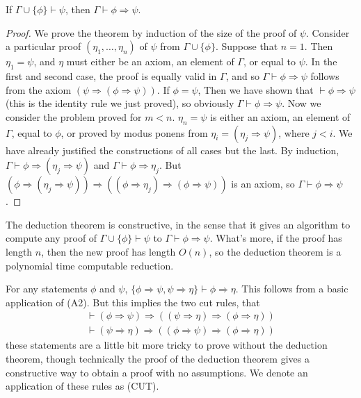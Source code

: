 \begin{theorem}
    If $\Gamma \cup \{ \phi \} \vdash \psi$, then $\Gamma \vdash \phi \Rightarrow \psi$.
\end{theorem}
\begin{proof}
    We prove the theorem by induction of the size of the proof of $\psi$. Consider a particular proof $(\eta_1, \dots, \eta_n)$ of $\psi$ from $\Gamma \cup \{ \phi \}$. Suppose that $n = 1$. Then $\eta_1 = \psi$, and $\eta$ must either be an axiom, an element of $\Gamma$, or equal to $\psi$. In the first and second case, the proof is equally valid in $\Gamma$, and so $\Gamma \vdash \phi \Rightarrow \psi$ follows from the axiom $(\psi \Rightarrow (\phi \Rightarrow \psi))$. If $\phi = \psi$, Then we have shown that $\vdash \phi \Rightarrow \psi$ (this is the identity rule we just proved), so obviously $\Gamma \vdash \phi \Rightarrow \psi$. Now we consider the problem proved for $m < n$. $\eta_n = \psi$ is either an axiom, an element of $\Gamma$, equal to $\phi$, or proved by modus ponens from $\eta_i = (\eta_j \Rightarrow \psi)$, where $j < i$. We have already justified the constructions of all cases but the last. By induction, $\Gamma \vdash \phi \Rightarrow (\eta_j \Rightarrow \psi)$ and $\Gamma \vdash \phi \Rightarrow \eta_j$. But $(\phi \Rightarrow (\eta_j \Rightarrow \psi)) \Rightarrow ((\phi \Rightarrow \eta_j) \Rightarrow (\phi \Rightarrow \psi))$ is an axiom, so $\Gamma \vdash \phi \Rightarrow \psi$.
\end{proof}

The deduction theorem is constructive, in the sense that it gives an algorithm to compute any proof of $\Gamma \cup \{ \phi \} \vdash \psi$ to $\Gamma \vdash \phi \Rightarrow \psi$. What's more, if the proof has length $n$, then the new proof has length $O(n)$, so the deduction theorem is a polynomial time computable reduction.

\begin{example}
    For any statements $\phi$ and $\psi$, $\{ \phi \Rightarrow \psi, \psi \Rightarrow \eta \} \vdash \phi \Rightarrow \eta$. This follows from a basic application of (A2). But this implies the two cut rules, that
    \begin{gather*}
        \vdash (\phi \Rightarrow \psi) \Rightarrow ((\psi \Rightarrow \eta) \Rightarrow (\phi \Rightarrow \eta))\\
        \vdash (\psi \Rightarrow \eta) \Rightarrow ((\phi \Rightarrow \psi) \Rightarrow (\phi \Rightarrow \eta))
    \end{gather*}
    these statements are a little bit more tricky to prove without the deduction theorem, though technically the proof of the deduction theorem gives a constructive way to obtain a proof with no assumptions. We denote an application of these rules as (CUT).
\end{example}


